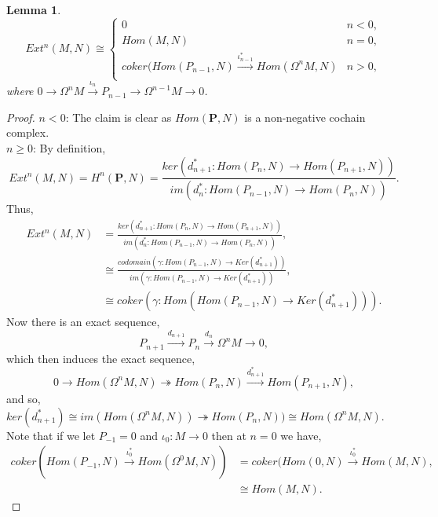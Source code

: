 \documentclass[11.5pt, twoside, a4paper, titlepage]{report}
\theoremstyle{definition}
\theoremstyle{plain}
\newtheorem{lem}[mydef]{Lemma}
\begin{document}
\begin{lem}
\begin{equation*}
Ext^n(M, N) \cong 
\begin{cases}
0& n<0,\\
Hom(M,N) & n=0,\\
coker(Hom(P_{n-1}, N) \xrightarrow{\iota^{\ast}_{n-1}} Hom(\Omega^nM, N) & n>0,\\
\end{cases}
\end{equation*}
where $0\xrightarrow{} \Omega^nM \xrightarrow{\iota_n} P_{n-1} \xrightarrow{}\Omega^{n-1}M\xrightarrow{}0$.
\end{lem}
\begin{proof}
$n<0$: The claim is clear as $Hom(\mathbf{P}, N)$ is a non-negative cochain complex.\\
$n\geq 0$: By definition,
\begin{equation*}
Ext^n(M,N)=H^n(\mathbf{P},N)=\frac{ker(d^{\ast}_{n+1}:Hom(P_{n}, N) \to Hom(P_{n+1}, N))}{im(d^{\ast}_n:Hom(P_{n-1}, N) \to Hom(P_{n}, N))}.
\end{equation*}
Thus, 
\begin{align*}
Ext^n(M,N) &=\frac{ker(d^{\ast}_{n+1}:Hom(P_{n}, N) \to Hom(P_{n+1}, N))}{im(d^{\ast}_n:Hom(P_{n-1}, N) \to Hom(P_{n}, N))}, \\
& \cong \frac{codomain(\gamma: Hom(P_{n-1}, N) \to Ker(d^{\ast}_{n+1}))}{im(\gamma:Hom(P_{n-1}, N) \to Ker(d^{\ast}_{n+1}))},\\
& \cong coker(\gamma: Hom(Hom(P_{n-1}, N) \to Ker(d^{\ast}_{n+1}))).
\end{align*}
Now there is an exact sequence, 
\begin{equation*}
P_{n+1} \xrightarrow{d_{n+1}} P_n \xrightarrow{d_n} \Omega^nM \xrightarrow{}0,
\end{equation*}
which then induces the exact sequence,
\begin{equation*}
0 \xrightarrow{} Hom(\Omega^nM, N) \twoheadrightarrow Hom(P_n, N) \xrightarrow{d^{\ast}_{n+1} } Hom(P_{n+1}, N),
\end{equation*}
and so, $ker(d^{\ast}_{n+1}) \cong im(Hom(\Omega^nM, N))\twoheadrightarrow Hom(P_n, N)) \cong Hom(\Omega^nM, N)$.\\ 
Note that if we let $P_{-1}=0$ and $\iota_0:M \to 0$ then at $n=0$ we have,
\begin{align*}
coker(Hom(P_{-1}, N) \xrightarrow{\iota^{\ast}_0} Hom(\Omega^0M, N))&=coker(Hom(0, N) \xrightarrow{\iota^{\ast}_0} Hom(M, N), \\
&\cong Hom(M,N).
\end{align*}
\end{proof}
\end{document}
